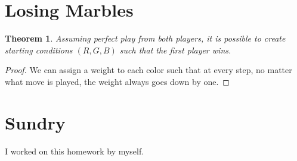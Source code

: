 \documentclass{article}
\newtheorem{theorem}{Theorem}
\begin{document}
\section{Losing Marbles}

\begin{theorem}
    Assuming perfect play from both players, it is possible to create starting conditions \((R, G, B)\) such that the first player wins.
\end{theorem}
\begin{proof}
    We can assign a weight to each color such that at every step, no matter what move is played, the weight always goes down by one.
\end{proof}

\section{Sundry}

I worked on this homework by myself.
\end{document}
